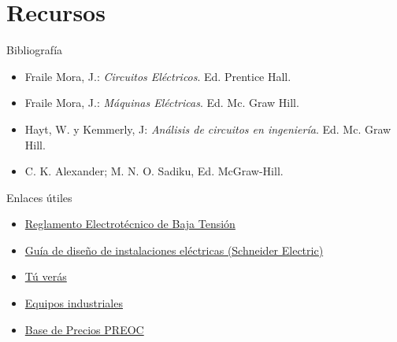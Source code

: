 \documentclass[xcolor={usenames,svgnames,dvipsnames}]{beamer}
\begin{document}
\section{Recursos}
\label{sec:org9dd293f}

\begin{frame}[label={sec:org65671ed}]{Bibliografía}
\begin{itemize}
\item \alert{Fraile Mora, J.}: \emph{Circuitos Eléctricos}. Ed. Prentice Hall.

\item \alert{Fraile Mora, J.}: \emph{Máquinas Eléctricas}. Ed. Mc. Graw Hill.

\item \alert{Hayt, W. y Kemmerly, J}: \emph{Análisis de circuitos en ingeniería}. Ed.
Mc. Graw Hill.
\item \alert{C. K. Alexander; M. N. O. Sadiku}, Ed. McGraw-Hill.
\end{itemize}
\end{frame}

\begin{frame}[label={sec:org2c0b3cc}]{Enlaces útiles}
\begin{itemize}
\item \href{http://www.f2i2.net/legislacionseguridadindustrial/Si\_ambito.aspx?id\_am=76}{Reglamento Electrotécnico de Baja Tensión}

\item \href{http://www.schneiderelectric.es/sites/spain/es/productos-servicios/distribucion-electrica/descarga/pdf-guia-diseno-instalaciones-electricas.page}{Guía de diseño de instalaciones eléctricas (Schneider Electric)}

\item \href{http://tuveras.com/index.html}{Tú verás}

\item \href{http://www.directindustry.com/}{Equipos industriales}

\item \href{http://www.preoc.es/}{Base de Precios PREOC}
\end{itemize}
\end{frame}
\end{document}
